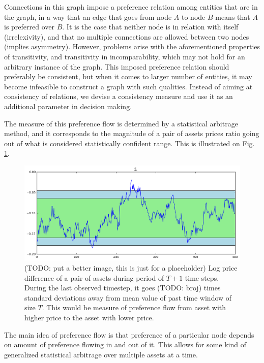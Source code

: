 \documentclass[letterpaper, 10 pt, conference]{ieeeconf}
\begin{document}
  Connections in this graph impose a preference relation among entities that are in the graph, in a way that an edge that goes from node $A$ to node $B$ means that $A$ is preferred over $B$.
  It is the case that neither node is in relation with itself (irrelexivity), and that no multiple connections are allowed between two nodes (implies asymmetry).
  However, problems arise with the aforementioned properties of transitivity, and transitivity in incomparability, which may not hold for an arbitrary instance of the graph.
  This imposed preference relation should preferably be consistent, but when it comes to larger number of entities, it may become infeasible to construct a graph with such qualities.
  Instead of aiming at consistency of relations, we devise a consistency measure and use it as an additional parameter in decision making.
  
  The measure of this preference flow is determined by a statistical arbitrage method, and it corresponds to the magnitude of a pair of assets prices ratio going out of what is considered statistically confident range.
  This is illustrated on Fig. \ref{fig:devmag}.
  
  \begin{figure}[h]
    \centering
    \includegraphics[width=0.9\columnwidth]{graphics/deviation-magnitude.png}
    \caption{(TODO: put a better image, this is just for a placeholder) Log price difference of a pair of assets during period of $T + 1$ time steps.
    During the last observed timestep, it goes (TODO: broj) times standard deviations away from mean value of past time window of size $T$.
    This would be measure of preference flow from asset with higher price to the asset with lower price.}
    \label{fig:devmag}
  \end{figure}

  The main idea of preference flow is that preference of a particular node depends on amount of preference flowing in and out of it.
  This allows for some kind of generalized statistical arbitrage over multiple assets at a time.
   
\end{document}

